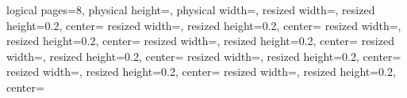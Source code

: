 \pgfpagesphysicalpageoptions%
{
logical pages=8,
physical height=\paperheight,
physical width=\paperwidth,
}
{
resized width=\pgfphysicalwidth,
resized height=0.2\pgfphysicalheight,
center=\pgfpoint{0.25\pgfphysicalwidth}{0.85\pgfphysicalheight}
}
{
resized width=\pgfphysicalwidth,
resized height=0.2\pgfphysicalheight,
center=\pgfpoint{0.75\pgfphysicalwidth}{0.85\pgfphysicalheight}
}
{
resized width=\pgfphysicalwidth,
resized height=0.2\pgfphysicalheight,
center=\pgfpoint{0.25\pgfphysicalwidth}{0.60\pgfphysicalheight}
}
{
resized width=\pgfphysicalwidth,
resized height=0.2\pgfphysicalheight,
center=\pgfpoint{0.75\pgfphysicalwidth}{0.60\pgfphysicalheight}
}
{
resized width=\pgfphysicalwidth,
resized height=0.2\pgfphysicalheight,
center=\pgfpoint{0.25\pgfphysicalwidth}{0.3725\pgfphysicalheight}
}
{
resized width=\pgfphysicalwidth,
resized height=0.2\pgfphysicalheight,
center=\pgfpoint{0.75\pgfphysicalwidth}{0.3725\pgfphysicalheight}
}
{
resized width=\pgfphysicalwidth,
resized height=0.2\pgfphysicalheight,
center=\pgfpoint{0.25\pgfphysicalwidth}{0.15\pgfphysicalheight}
}
{
resized width=\pgfphysicalwidth,
resized height=0.2\pgfphysicalheight,
center=\pgfpoint{0.75\pgfphysicalwidth}{0.15\pgfphysicalheight}
}

